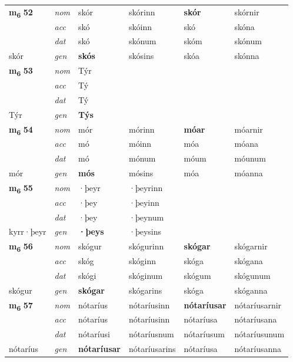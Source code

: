 \begin{longtable}[l]{X>{\footnotesize\itshape}XXXXX}
\multirow{3}{*}{{{\textbf{m{\textsubscript{6}}} \Large{\textbf{52}}}}} & nom & skór & skórinn & \textbf{skór} & skórnir \\*
 & acc & skó & skóinn & skó & skóna \\*
 & dat & skó & skónum & skóm & skónum \\*
 {\footnotesize{skór}} & gen & \textbf{skós} & skósins & skóa & skónna \\
\midrule

\multirow{3}{*}{{{\textbf{m{\textsubscript{6}}} \Large{\textbf{53}}}}} & nom & Týr &  & \textbf{} &  \\*
 & acc & Tý &  &  &  \\*
 & dat & Tý &  &  &  \\*
 {\footnotesize{Týr}} & gen & \textbf{Týs} &  &  &  \\
\midrule

\multirow{3}{*}{{{\textbf{m{\textsubscript{6}}} \Large{\textbf{54}}}}} & nom & mór & mórinn & \textbf{móar} & móarnir \\*
 & acc & mó & móinn & móa & móana \\*
 & dat & mó & mónum & móum & móunum \\*
 {\footnotesize{mór}} & gen & \textbf{mós} & mósins & móa & móanna \\
\midrule

\multirow{3}{*}{{{\textbf{m{\textsubscript{6}}} \Large{\textbf{55}}}}} & nom & ·þeyr & ·þeyrinn & \textbf{} &  \\*
 & acc & ·þey & ·þeyinn &  &  \\*
 & dat & ·þey & ·þeynum &  &  \\*
 {\footnotesize{kyrr\allowbreak ·þeyr}} & gen & \textbf{·þeys} & ·þeysins &  &  \\
\midrule

\multirow{3}{*}{{{\textbf{m{\textsubscript{6}}} \Large{\textbf{56}}}}} & nom & skógur & skógurinn & \textbf{skógar} & skógarnir \\*
 & acc & skóg & skóginn & skóga & skógana \\*
 & dat & skógi & skóginum & skógum & skógunum \\*
 {\footnotesize{skógur}} & gen & \textbf{skógar} & skógarins & skóga & skóganna \\
\midrule

\multirow{3}{*}{{{\textbf{m{\textsubscript{6}}} \Large{\textbf{57}}}}} & nom & nótaríus & nótaríusinn & \textbf{nótaríusar} & nótaríusarnir \\*
 & acc & nótaríus & nótaríusinn & nótaríusa & nótaríusana \\*
 & dat & nótaríusi & nótaríusnum & nótaríusum & nótaríusunum \\*
 {\footnotesize{nótaríus}} & gen & \textbf{nótaríusar} & nótaríusarins & nótaríusa & nótaríusanna \\
\midrule


\end{longtable}
